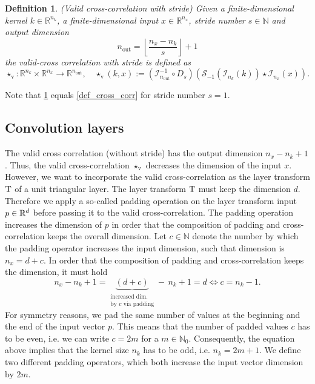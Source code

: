 \documentclass[twoside,a4paper]{article}
\newtheorem{definition}{Definition}
\begin{document}
\begin{definition}\label{def_cross_corr_stride}
	(Valid cross-correlation with stride)
	Given a finite-dimensional kernel $k \in \mathbb{R}^{n_k}$, a finite-dimensional
	input $x \in \mathbb{R}^{n_x}$, stride number $s \in \mathbb{N}$ and output dimension
	\begin{equation*}
		n_{\text{out}} = \left\lfloor \frac{n_x - n_k}{s} \right\rfloor + 1
	\end{equation*}
	the valid-cross correlation with stride is defined as
	\begin{equation*}
		\star_{\text{v}} : \mathbb{R}^{n_k} \times \mathbb{R}^{n_x} \to \mathbb{R}^{n_{\text{out}}},
		\quad \star_{\text{v}}(k,x) := 
		(\mathcal{I}_{n_{\text{out}}}^{-1} \circ D_s)
		(
			\mathcal{S}_{-1}( \mathcal{I}_{n_k}(k)) \star \mathcal{I}_{n_x}(x)
		)
		.
	\end{equation*}
\end{definition}

Note that \cref{def_cross_corr_stride} equals \cref{def_cross_corr} for stride number $s=1$.

\subsection{Convolution layers}

The valid cross correlation (without stride) has the output dimension $n_x - n_k + 1$.
Thus, the valid cross-correlation $\star_{\text{v}}$ decreases the dimension of the input $x$.
However, we want to incorporate the valid cross-correlation as the layer transform $\mathrm{T}$ of a
unit triangular layer. The layer transform $\mathrm{T}$ must keep the dimension $d$.
Therefore we apply a so-called padding operation on the layer transform input $p \in \mathbb{R}^d$ 
before passing it to the valid
cross-correlation. The padding operation increases the dimension of $p$ in order
that the composition of padding and cross-correlation keeps the overall dimension.
Let $c \in \mathbb{N}$ denote the number by which the padding operator increases 
the input dimension, such that dimension is $n_x = d+c$. 
In order that the composition of padding and cross-correlation keeps the dimension, it must hold
\begin{equation*}
	n_x - n_k + 1 = \underbrace{(d+c)}_{\substack{
		\text{increased dim.} \\
		\text{by } c \text{ via padding}
	}} - \, n_k + 1 = d \iff c = n_k-1
	.
\end{equation*}
For symmetry reasons, we pad the same number of values at the beginning and 
the end of the input vector $p$. This means that the number of padded values $c$ has to be even,
i.e. we can write $c=2m$ for a $m \in \mathbb{N}_0$.
Consequently, the equation above implies that the kernel size $n_k$ has to be odd, i.e. 
$n_k = 2m+1$. We define two different padding operators,
which both increase the input vector dimension by $2m$.
\end{document}
